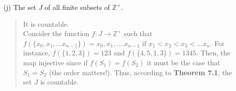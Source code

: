 \documentclass[12pt, a4paper]{article}
\newcommand{\pints}{\mathbb{Z}^+} %
\newcommand{\rarr}{\rightarrow}
\begin{document}
\begin{itemize}
\begin{itemize}
\item[]

\item[(j)]
The set $J$ of all finite subsets of $\pints$.
\begin{quote}
It is countable.\\
Consider the function $f : J \rarr \pints$ such that
$f(\{x_0, x_1, ... x_{n-1}\}) = x_0, x_1, .... x_{n - 1}$ if $x_1 < x_2 < x_3 < ... x_n$.
For instance, $f(\{1, 2, 3\}) = 123$ and $f(\{4, 5, 1, 3\}) = 1345$. Then, the map injective since if $f(S_1) = f(S_2)$ it must be the case that $S_1 = S_2$ (the order matters!).
Thus, according to \textbf{Theorem 7.1}, the set $J$ is countable.
\end{quote}
\end{itemize}

\end{itemize}
\end{document}
